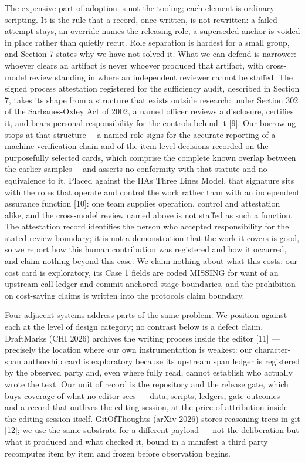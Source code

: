 \documentclass[
  english,
]{article}
\begin{document}
The expensive part of adoption is not the tooling; each element is ordinary scripting. It is the rule that a record, once written, is not rewritten: a failed attempt stays, an override names the releasing role, a superseded anchor is voided in place rather than quietly recut. Role separation is hardest for a small group, and Section 7 states why we have not solved it. What we can defend is narrower: whoever clears an artifact is never whoever produced that artifact, with cross-model review standing in where an independent reviewer cannot be staffed. The signed process attestation registered for the sufficiency audit, described in Section 7, takes its shape from a structure that exists outside research: under Section 302 of the Sarbanes-Oxley Act of 2002, a named officer reviews a disclosure, certifies it, and bears personal responsibility for the controls behind it {[}9{]}. Our borrowing stops at that structure -\/- a named role signs for the accurate reporting of a machine verification chain and of the item-level decisions recorded on the purposefully selected cards, which comprise the complete known overlap between the earlier samples -\/- and asserts no conformity with that statute and no equivalence to it. Placed against the IIA\textquotesingle s Three Lines Model, that signature sits with the roles that operate and control the work rather than with an independent assurance function {[}10{]}: one team supplies operation, control and attestation alike, and the cross-model review named above is not staffed as such a function. The attestation record identifies the person who accepted responsibility for the stated review boundary; it is not a demonstration that the work it covers is good, so we report how this human contribution was registered and how it occurred, and claim nothing beyond this case. We claim nothing about what this costs: our cost card is exploratory, its Case 1 fields are coded MISSING for want of an upstream call ledger and commit-anchored stage boundaries, and the prohibition on cost-saving claims is written into the protocol\textquotesingle s claim boundary.

Four adjacent systems address parts of the same problem. We position against each at the level of design category; no contrast below is a defect claim. DraftMarks (CHI 2026) archives the writing process inside the editor {[}11{]} --- precisely the location where our own instrumentation is weakest: our character-span authorship card is exploratory because its upstream span ledger is registered by the observed party and, even where fully read, cannot establish who actually wrote the text. Our unit of record is the repository and the release gate, which buys coverage of what no editor sees --- data, scripts, ledgers, gate outcomes --- and a record that outlives the editing session, at the price of attribution inside the editing session itself. GitOfThoughts (arXiv 2026) stores reasoning trees in git {[}12{]}; we use the same substrate for a different payload --- not the deliberation but what it produced and what checked it, bound in a manifest a third party recomputes item by item and frozen before observation begins.
\end{document}
